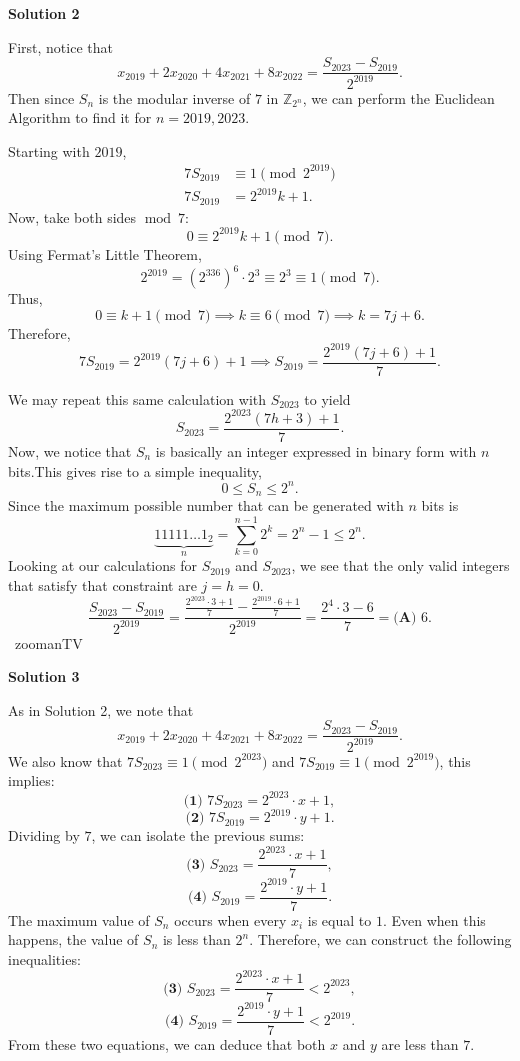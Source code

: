 \begin{enumerate}
 



\textbf{Solution 2}

First, notice that 
 \[x_{2019} + 2x_{2020} + 4x_{2021} + 8x_{2022} = \frac{S_{2023} - S_{2019}}{2^{2019}}.\]Then since $S_n$ is the modular inverse of $7$ in $\mathbb{Z}_{2^n}$, we can perform the Euclidean Algorithm to find it for $n = 2019,2023$.

 Starting with $2019$, 
 \begin{align*} 7S_{2019} &\equiv 1 \pmod{2^{2019}} \\ 7S_{2019} &= 2^{2019}k + 1. \end{align*}
Now, take both sides $\operatorname{mod} \ 7$:
 \[0 \equiv 2^{2019}k + 1 \pmod{7}.\]Using Fermat's Little Theorem, 
 \[2^{2019} = (2^{336})^6 \cdot 2^3 \equiv 2^3 \equiv 1 \pmod{7}.\]Thus,  
 \[0 \equiv k + 1 \pmod{7} \implies k \equiv 6 \pmod{7} \implies k = 7j + 6.\]Therefore, 
 \[7S_{2019} = 2^{2019} (7j + 6) + 1 \implies S_{2019} = \frac{2^{2019} (7j + 6) + 1}{7}.\]

 We may repeat this same calculation with $S_{2023}$ to yield 
 \[S_{2023} = \frac{2^{2023} (7h + 3) + 1}{7}.\]Now, we notice that $S_n$ is basically an integer expressed in binary form with $n$ bits.This gives rise to a simple inequality, 
 \[0 \leqslant S_n \leqslant 2^n.\]Since the maximum possible number that can be generated with $n$ bits is 
 \[\underbrace{{11111\dotsc1}_2}_{n} = \sum_{k=0}^{n-1} 2^k = 2^n - 1 \leqslant 2^n.\]Looking at our calculations for $S_{2019}$ and $S_{2023}$, we see that the only valid integers that satisfy that constraint are $j = h = 0$.
 \[\frac{S_{2023} - S_{2019}}{2^{2019}} = \frac{\frac{2^{2023} \cdot 3 + 1}{7} - \frac{2^{2019} \cdot 6 + 1}{7}}{2^{2019}} = \frac{2^4 \cdot 3 - 6}{7} = \boxed{\textbf{(A) } 6}.\]~zoomanTV

 



\textbf{Solution 3}

As in Solution 2, we note that 
 \[x_{2019}+2x_{2020}+4x_{2021}+8x_{2022}=\frac{S_{2023}-S_{2019}}{2^{2019}}.\]We also know that $7S_{2023} \equiv 1 \pmod{2^{2023}}$ and $7S_{2019} \equiv 1 \pmod{2^{2019}}$, this implies:
 \[\textbf{(1) } 7S_{2023}=2^{2023}\cdot{x} + 1,\]
 \[\textbf{(2) } 7S_{2019}=2^{2019}\cdot{y} + 1.\]Dividing by $7$, we can isolate the previous sums:
 \[\textbf{(3) } S_{2023}=\frac{2^{2023}\cdot{x} + 1}{7},\]
 \[\textbf{(4) } S_{2019}=\frac{2^{2019}\cdot{y} + 1}{7}.\]The maximum value of $S_n$ occurs when every $x_i$ is equal to $1$. Even when this happens, the value of $S_n$ is less than $2^n$. Therefore, we can construct the following inequalities:
 \[\textbf{(3) } S_{2023}=\frac{2^{2023}\cdot{x} + 1}{7} < 2^{2023},\]
 \[\textbf{(4) } S_{2019}=\frac{2^{2019}\cdot{y} + 1}{7} < 2^{2019}.\]From these two equations, we can deduce that both $x$ and $y$ are less than $7$. 


\end{enumerate}
